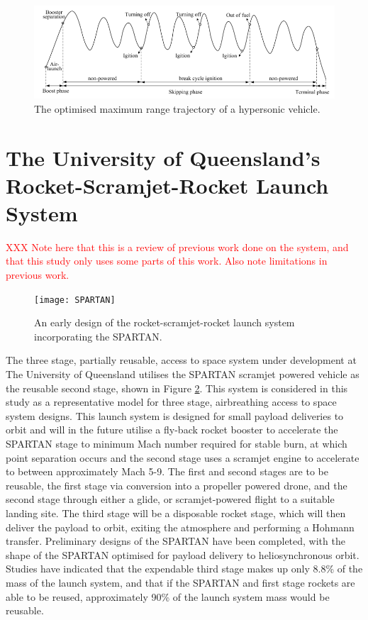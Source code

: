  \begin{figure}[ht]
 	\centering
 	\includegraphics[width=0.9\linewidth]{"figures/2_literature-review/chai-boost skip"}
 	\caption{The optimised maximum range trajectory of a hypersonic vehicle\cite{Chai2015}.}
 	\label{fig:chai-boostskip}
 \end{figure}



\section{The University of Queensland's Rocket-Scramjet-Rocket Launch System}

\textcolor{red}{XXX Note here that this is a review of previous work done on the system, and that this study only uses some parts of this work. Also note limitations in previous work.}

\begin{figure}[ht]
	\centering
	\texttt{[image: SPARTAN]}
	\caption{An early design of the rocket-scramjet-rocket launch system incorporating the SPARTAN\cite{Jazra2013}.}
	\label{fig:SPARTAN}
\end{figure}
The three stage, partially reusable, access to space system under development at The University of Queensland utilises the SPARTAN\cite{Jazra2013} scramjet powered vehicle as the reusable second stage, shown in Figure \ref{fig:SPARTAN}. This system is considered in this study as a representative model for three stage, airbreathing access to space system designs. This launch system is designed for small payload deliveries to orbit and will in the future utilise a fly-back rocket booster to accelerate the SPARTAN stage to minimum Mach number required for stable burn, at which point separation occurs and the second stage uses a scramjet engine to accelerate to between approximately Mach 5-9. The first and second stages are to be reusable, the first stage via conversion into a propeller powered drone, and the second stage through either a glide, or scramjet-powered flight to a suitable landing site.
The third stage will be a disposable rocket stage, which will then deliver the payload to orbit, exiting the atmosphere and performing a Hohmann transfer. 
Preliminary designs of the SPARTAN have been completed, with the shape of the SPARTAN optimised for payload delivery to heliosynchronous orbit.
Studies have indicated that the expendable third stage makes up only 8.8\% of the mass of the launch system, and that if the SPARTAN and first stage rockets are able to be reused, approximately 90\% of the launch system mass would be reusable\cite{Preller2017b}.

